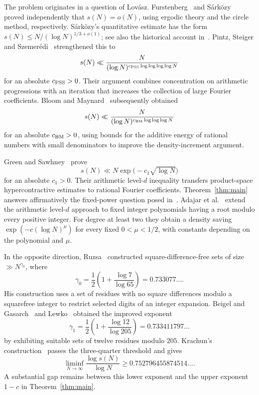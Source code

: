 The problem originates in a question of Lov\'asz.
Furstenberg~\cite[Theorem~1.2]{Furstenberg1977} and S\'ark\"ozy~\cite{Sarkozy1978I}
proved independently that $s(N)=o(N)$, using ergodic theory and the
circle method, respectively. S\'ark\"ozy's quantitative estimate has the form
$s(N)\le N/(\log N)^{1/3+o(1)}$; see also the historical account
in~\cite{BloomMaynard2022}. Pintz, Steiger and
Szemer\'edi~\cite[Theorem~1]{PSS1988} strengthened this to
\[
 s(N)\ll \frac{N}{(\log N)^{c_{\rm PSS}\log\log\log\log N}}
\]
for an absolute $c_{\rm PSS}>0$. Their argument combines concentration on
arithmetic progressions with an iteration that increases the collection
of large Fourier coefficients. Bloom and Maynard~\cite{BloomMaynard2022}
subsequently obtained
\[
 s(N)\ll \frac{N}{(\log N)^{c_{\rm BM}\log\log\log N}}
\]
for an absolute $c_{\rm BM}>0$, using bounds for the additive energy of
rational numbers with small denominators to improve the density-increment
argument.


Green and Sawhney~\cite[Theorem~1.1]{GreenSawhney2025} prove
\[
 s(N)\ll N\exp\bigl(-c_1\sqrt{\log N}\bigr)
\]
for an absolute $c_1>0$. Their arithmetic level-$d$ inequality transfers
product-space hypercontractive estimates to rational Fourier coefficients.
Theorem~\ref{thm:main} answers affirmatively the fixed-power question
posed in~\cite[Section~1.1]{GreenSawhney2025}.
Adajar et al.~\cite[Theorem~1.1]{AdajarEtAl2026} extend the arithmetic
level-$d$ approach to fixed integer polynomials having a root modulo
every positive integer. For degree at least two they obtain a density
saving $\exp(-c(\log N)^\mu)$ for every fixed $0<\mu<1/2$, with
constants depending on the polynomial and $\mu$.

In the opposite direction, Ruzsa~\cite[Theorems~1 and~2]{Ruzsa1984}
constructed square-difference-free sets of size
$\gg N^{\gamma_0}$, where
\[
 \gamma_0=\frac12\left(1+\frac{\log 7}{\log 65}\right)
          =0.733077\ldots.
\]
His construction uses a set of residues with no square differences
modulo a squarefree integer to restrict selected digits of an integer
expansion. Beigel and Gasarch~\cite[Lemma~3.6 and the proof of Theorem~3.7]{BeigelGasarch2008} and
Lewko~\cite[Theorem~3]{Lewko2015} obtained the improved exponent
\[
 \gamma_1=\frac12\left(1+\frac{\log 12}{\log 205}\right)
          =0.733411797\ldots
\]
by exhibiting suitable sets of twelve residues modulo $205$.
Krachun's construction~\cite[Theorem~1]{Krachun2026} passes the
three-quarter threshold and gives
\[
 \liminf_{N\to\infty}\frac{\log s(N)}{\log N}
 \ge 0.752796455874514\ldots.
\]
A substantial gap remains between this lower exponent and the upper
exponent $1-c$ in Theorem~\ref{thm:main}.

